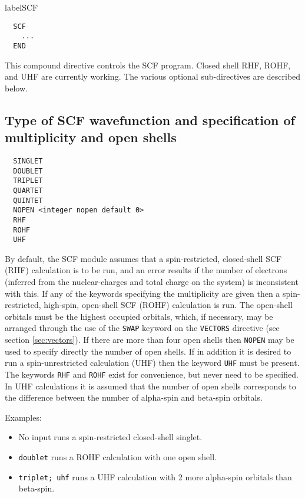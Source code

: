 label{SCF}

\begin{verbatim}
  SCF
    ...
  END
\end{verbatim}

This compound directive controls the SCF program.  Closed shell RHF,
ROHF, and UHF are currently working.  The various optional
sub-directives are described below.

\subsection{Type of SCF wavefunction and specification of multiplicity
and open shells}

\begin{verbatim}
  SINGLET 
  DOUBLET 
  TRIPLET 
  QUARTET 
  QUINTET 
  NOPEN <integer nopen default 0>
  RHF
  ROHF
  UHF
\end{verbatim}

By default, the SCF module assumes that a spin-restricted,
closed-shell SCF (RHF) calculation is to be run, and an error results
if the number of electrons (inferred from the nuclear-charges and
total charge on the system) is inconsistent with this.  If any of the
keywords specifying the multiplicity are given then a spin-restricted,
high-spin, open-shell SCF (ROHF) calculation is run.  The open-shell
orbitals must be the highest occupied orbitals, which, if necessary,
may be arranged through the use of the \verb+SWAP+ keyword on the
\verb+VECTORS+ directive (see section \ref{sec:vectors}). If there are
more than four open shells then \verb+NOPEN+ may be used to specify
directly the number of open shells.  If in addition it is desired to
run a spin-unrestricted calculation (UHF) then the keyword \verb+UHF+
must be present.  The keywords \verb+RHF+ and \verb+ROHF+ exist for
convenience, but never need to be specified.  In UHF calculations it is
assumed that the number of open shells corresponds to the difference
between the number of alpha-spin and beta-spin orbitals.

Examples:
\begin{itemize}
\item No input runs a spin-restricted closed-shell singlet.
\item \verb+doublet+ runs a ROHF calculation with one open shell.
\item \verb+triplet; uhf+ runs a UHF calculation with 2 more
  alpha-spin orbitals than beta-spin.
\end{itemize}


